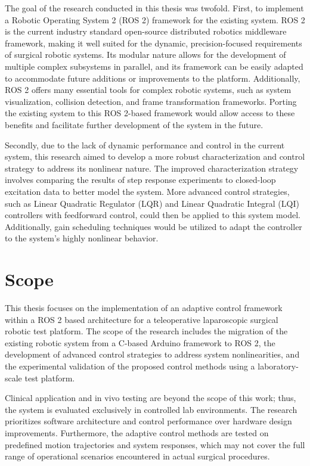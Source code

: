 The goal of the research conducted in this thesis was twofold. First, to implement a Robotic Operating System 2 (ROS 2) framework for the existing system. ROS 2 is the current industry standard open-source distributed robotics middleware framework, making it well suited for the dynamic, precision-focused requirements of surgical robotic systems. Its modular nature allows for the development of multiple complex subsystems in parallel, and its framework can be easily adapted to accommodate future additions or improvements to the platform. Additionally, ROS 2 offers many essential tools for complex robotic systems, such as system visualization, collision detection, and frame transformation frameworks. Porting the existing system to this ROS 2-based framework would allow access to these benefits and facilitate further development of the system in the future.

Secondly, due to the lack of dynamic performance and control in the current system, this research aimed to develop a more robust characterization and control strategy to address its nonlinear nature. The improved characterization strategy involves comparing the results of step response experiments to closed-loop excitation data to better model the system. More advanced control strategies, such as Linear Quadratic Regulator (LQR) and Linear Quadratic Integral (LQI) controllers with feedforward control, could then be applied to this system model. Additionally, gain scheduling techniques would be utilized to adapt the controller to the system’s highly nonlinear behavior.


\section{Scope}
\label{section:scope_limitations}

This thesis focuses on the implementation of an adaptive control framework within a ROS 2 based architecture for a teleoperative laparoscopic surgical robotic test platform. The scope of the research includes the migration of the existing robotic system from a C-based Arduino framework to ROS 2, the development of advanced control strategies to address system nonlinearities, and the experimental validation of the proposed control methods using a laboratory-scale test platform.

Clinical application and in vivo testing are beyond the scope of this work; thus, the system is evaluated exclusively in controlled lab environments. The research prioritizes software architecture and control performance over hardware design improvements. Furthermore, the adaptive control methods are tested on predefined motion trajectories and system responses, which may not cover the full range of operational scenarios encountered in actual surgical procedures.


